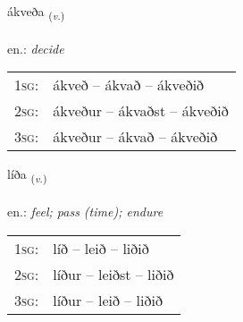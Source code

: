 \documentclass[frontgrid, backgrid]{flacards}\usepackage[]{graphicx}\usepackage[]{xcolor}
\begin{document}
\renewcommand{\blhead}{\vskip5pt {\small\bfseries\footnotesize Sagnorð | Verb }}
\renewcommand{\bcfoot}{\vskip5pt \hspace{2pt}{\small\bfseries\footnotesize 1K}}


{ákveða \small{\textsubscript{(\textit{v.})}} \\[1ex] %
\textphonetic{[auːkʰvɛða]} \\
en.: \emph{decide} \\  [2ex]
\renewcommand*{\arraystretch}{0.8}
\begin{tabular}{p{1cm}l}
\textsc{1sg}: & ákveð -- ákvað -- ákveðið \\ 
\textsc{2sg}: & ákveður -- ákvaðst -- ákveðið \\ 
\textsc{3sg}: & ákveður -- ákvað -- ákveðið \\ 
\end{tabular}
}

\renewcommand{\flhead}{\vskip5pt \fboxsep=0pt {\small\bfseries\footnotesize Sagnorð | Verb}}
\renewcommand{\fcfoot}{\vskip5pt \fboxsep=0pt \hspace{2pt}{\small\bfseries\footnotesize 1K}}

\renewcommand{\blhead}{\vskip5pt {\small\bfseries\footnotesize Sagnorð | Verb }}
\renewcommand{\bcfoot}{\vskip5pt \hspace{2pt}{\small\bfseries\footnotesize 1K}}


{líða \small{\textsubscript{(\textit{v.})}} \\[1ex] %
\textphonetic{[liːða]} \\
en.: \emph{feel; pass (time); endure} \\  [2ex]
\renewcommand*{\arraystretch}{0.8}
\begin{tabular}{p{1cm}l}
\textsc{1sg}: & líð -- leið -- liðið \\ 
\textsc{2sg}: & líður -- leiðst -- liðið \\ 
\textsc{3sg}: & líður -- leið -- liðið \\ 
\end{tabular}
}
\end{document}
